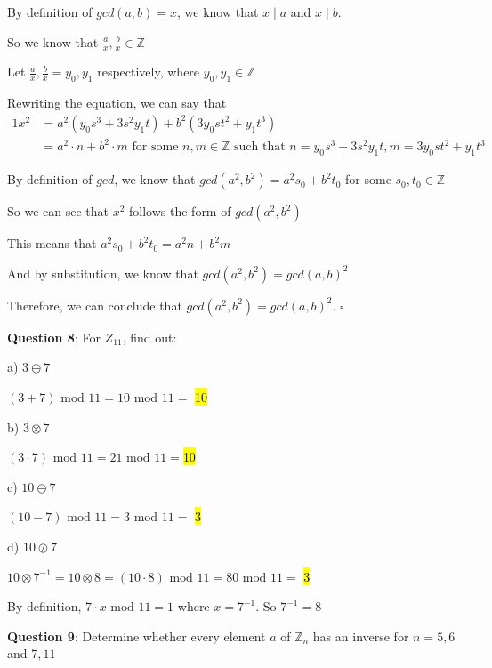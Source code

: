 \documentclass{article} %
\newcommand{\question}[2][]{\begin{flushleft}
        \textbf{Question #1}: #2

\end{flushleft}}
\begin{document}
    By definition of $gcd(a, b) = x$, we know that $x \mid a$ and $x \mid b$.

    So we know that $\frac{a}{x}, \frac{b}{x} \in \mathbb{Z}$

    Let $\frac{a}{x}, \frac{b}{x} = y_0, y_1$ respectively, where $y_0, y_1 \in \mathbb{Z}$

    Rewriting the equation, we can say that 
    \begin{alignat*}{1}
        x^2 &= a^2\left(y_0  s^3+3s^2  y_1 t\right)+b^2\left(3y_0st^2+y_1 t^3\right)\\
        &= a^2 \cdot n + b^2 \cdot m \text{ for some } n, m \in \mathbb{Z} \text{ such that } n = y_0  s^3+3s^2  y_1 t, m = 3y_0st^2+y_1 t^3
    \end{alignat*}

    By definition of $gcd$, we know that $gcd(a^2, b^2) = a^2s_0 + b^2t_0$ for some $s_0, t_0 \in \mathbb{Z}$

    So we can see that $x^2$ follows the form of $gcd(a^2, b^2)$

    This means that $a^2s_0 + b^2t_0 = a^2 n + b^2 m$

    And by substitution, we know that $gcd(a^2, b^2) = gcd(a, b)^2$

    Therefore, we can conclude that $gcd(a^2,b^2)=gcd(a,b)^2$. $\square$ 

    \newpage

    \question[8]{For $Z_{11}$, find out:}
    
    a) $3 \oplus 7$

    \tabto{0.9cm}$(3 + 7)\text{ mod } 11 = 10 \text{ mod } 11 =$ \hl{10}

    b) $3 \otimes 7$

    \tabto{0.9cm}$(3 \cdot 7)\text{ mod } 11 = 21 \text{ mod } 11 =$\hl{10}

    c) $10 \ominus 7$

    \tabto{0.9cm}$(10 - 7)\text{ mod } 11 = 3 \text{ mod } 11 = $ \hl{3}

    d) $10 \oslash 7$
    
    \tabto{0.95cm} $10 \otimes 7^{-1}= 10 \otimes 8 = (10 \cdot 8)\text{ mod } 11 = 80 \text{ mod } 11 =$ \hl{3}

    \tabto{0.95cm} By definition, $7 \cdot x \text{ mod } 11 = 1$ where $x = 7^{-1}$. So $7^{-1} = 8$

    \question[9]{Determine whether every element $a$ of $\mathbb{Z}_n$ has an inverse for $n = 5, 6$ and $ 7, 11$}
\end{document}
